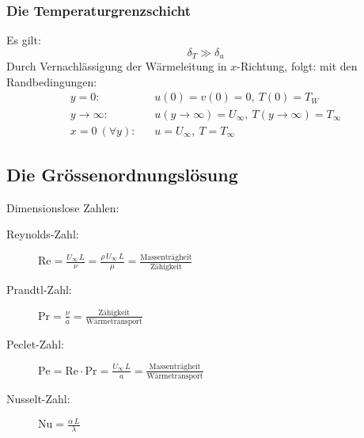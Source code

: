 		\subsubsection{Die Temperaturgrenzschicht} %
			Es gilt:
			\[
				\delta_T \gg \delta_u
			\]
			Durch Vernachlässigung der Wärmeleitung in $x$-Richtung, folgt:
			mit den Randbedingungen:
			\begin{align*}
				y = 0\text{:} \quad & u(0) = v(0) = 0 ,\ T(0) = T_W \\
				y \to \infty\text{:} \quad & u(y \to \infty) = U_\infty ,\ T(y \to \infty) = T_\infty \\
				x = 0 \ (\forall y)\text{:} \quad & u = U_\infty ,\ T = T_\infty
			\end{align*}
	\subsection{Die Grössenordnungslösung} %
		Dimensionslose Zahlen:
		\begin{description}
			\item[Reynolds-Zahl:] $\mathrm{Re} = \frac{U_\infty \, L}{\nu} = \frac{\rho\, U_\infty \, L}{\mu} = \frac{\text{Massenträgheit}}{\text{Zähigkeit}}$
			\item[Prandtl-Zahl:] $\mathrm{Pr} = \frac{\nu}{a} = \frac{\text{Zähigkeit}}{\text{Wärmetransport}}$
			\item[Peclet-Zahl:] $\mathrm{Pe} = \mathrm{Re} \cdot \mathrm{Pr} = \frac{U_\infty \, L}{a} = \frac{\text{Massenträgheit}}{\text{Wärmetransport}}$
			\item[Nusselt-Zahl:] $\mathrm{Nu} = \frac{\overline\alpha \, L}{\lambda}$
		\end{description}
		
